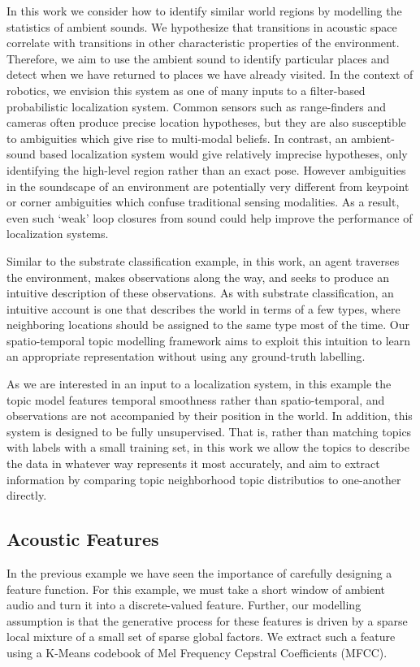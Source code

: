 In this work we consider how to identify similar world regions by modelling the statistics of ambient sounds. We hypothesize that transitions in acoustic space correlate with transitions in other characteristic properties of the environment. Therefore, we aim to use the ambient sound to identify particular places and detect when we have returned to places we have already visited. In the context of robotics, we envision this system as one of many inputs to a filter-based probabilistic localization system. Common sensors such as range-finders and cameras often produce precise location hypotheses, but they are also susceptible to ambiguities which give rise to multi-modal beliefs. In contrast, an ambient-sound based localization system would give relatively imprecise hypotheses, only identifying the high-level region rather than an exact pose. However ambiguities in the soundscape of an environment are potentially very different from keypoint or corner ambiguities which confuse traditional sensing modalities. As a result, even such `weak' loop closures from sound could help improve the performance of localization systems.

Similar to the substrate classification example, in this work, an agent traverses the environment, makes observations along the way, and seeks to produce an intuitive description of these observations. As with substrate classification, an intuitive account is one that describes the world in terms of a few types, where neighboring locations should be assigned to the same type most of the time. Our spatio-temporal topic modelling framework aims to exploit this intuition to learn an appropriate representation without using any ground-truth labelling.

As we are interested in an input to a localization system, in this example the topic model features temporal smoothness rather than spatio-temporal, and observations are not accompanied by their position in the world. In addition, this system is designed to be fully unsupervised. That is, rather than matching topics with labels with a small training set, in this work we allow the topics to describe the data in whatever way represents it most accurately, and aim to extract information by comparing topic neighborhood topic distributios to one-another directly.

\subsection{Acoustic Features}
In the previous example we have seen the importance of carefully designing a feature function. For this example, we must take a short window of ambient audio and turn it into a discrete-valued feature. Further, our modelling assumption is that the generative process for these features is driven by a sparse local mixture of a small set of sparse global factors. We extract such a feature using a K-Means codebook of Mel Frequency Cepstral Coefficients (MFCC).

